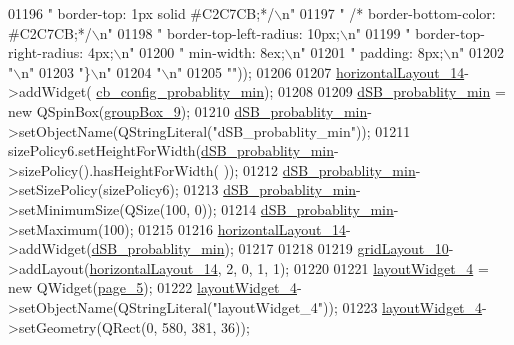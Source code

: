 \begin{DoxyCode}
01196 \textcolor{stringliteral}{" border-top: 1px solid #C2C7CB;*/\(\backslash\)n"}
01197 \textcolor{stringliteral}{"   /*  border-bottom-color: #C2C7CB;*/\(\backslash\)n"}
01198 \textcolor{stringliteral}{"     border-top-left-radius: 10px;\(\backslash\)n"}
01199 \textcolor{stringliteral}{"     border-top-right-radius: 4px;\(\backslash\)n"}
01200 \textcolor{stringliteral}{"     min-width: 8ex;\(\backslash\)n"}
01201 \textcolor{stringliteral}{"     padding: 8px;\(\backslash\)n"}
01202 \textcolor{stringliteral}{"\(\backslash\)n"}
01203 \textcolor{stringliteral}{"\}\(\backslash\)n"}
01204 \textcolor{stringliteral}{"\(\backslash\)n"}
01205 \textcolor{stringliteral}{""}));
01206 
01207         \hyperlink{a00080_aa53955f35b7d9f3d161525ed8639db84}{horizontalLayout\_14}->addWidget(
      \hyperlink{a00080_a6e32cc42adcf308df94cbbc9ac226f50}{cb\_config\_probablity\_min});
01208 
01209         \hyperlink{a00080_adfd6cf470c736f358c6982f9a635f04f}{dSB\_probablity\_min} = \textcolor{keyword}{new} QSpinBox(\hyperlink{a00080_ab492988d340548c7f30e098419ef10ee}{groupBox\_9});
01210         \hyperlink{a00080_adfd6cf470c736f358c6982f9a635f04f}{dSB\_probablity\_min}->setObjectName(QStringLiteral(\textcolor{stringliteral}{"dSB\_probablity\_min"}));
01211         sizePolicy6.setHeightForWidth(\hyperlink{a00080_adfd6cf470c736f358c6982f9a635f04f}{dSB\_probablity\_min}->sizePolicy().hasHeightForWidth(
      ));
01212         \hyperlink{a00080_adfd6cf470c736f358c6982f9a635f04f}{dSB\_probablity\_min}->setSizePolicy(sizePolicy6);
01213         \hyperlink{a00080_adfd6cf470c736f358c6982f9a635f04f}{dSB\_probablity\_min}->setMinimumSize(QSize(100, 0));
01214         \hyperlink{a00080_adfd6cf470c736f358c6982f9a635f04f}{dSB\_probablity\_min}->setMaximum(100);
01215 
01216         \hyperlink{a00080_aa53955f35b7d9f3d161525ed8639db84}{horizontalLayout\_14}->addWidget(\hyperlink{a00080_adfd6cf470c736f358c6982f9a635f04f}{dSB\_probablity\_min});
01217 
01218 
01219         \hyperlink{a00080_a79b264e6945e3b94a511427b1c270dd7}{gridLayout\_10}->addLayout(\hyperlink{a00080_aa53955f35b7d9f3d161525ed8639db84}{horizontalLayout\_14}, 2, 0, 1, 1);
01220 
01221         \hyperlink{a00080_ac4725768128006ab5bea6e58b67959d0}{layoutWidget\_4} = \textcolor{keyword}{new} QWidget(\hyperlink{a00080_a421261d29369be60b551aabe8b097597}{page\_5});
01222         \hyperlink{a00080_ac4725768128006ab5bea6e58b67959d0}{layoutWidget\_4}->setObjectName(QStringLiteral(\textcolor{stringliteral}{"layoutWidget\_4"}));
01223         \hyperlink{a00080_ac4725768128006ab5bea6e58b67959d0}{layoutWidget\_4}->setGeometry(QRect(0, 580, 381, 36));

\end{DoxyCode}
